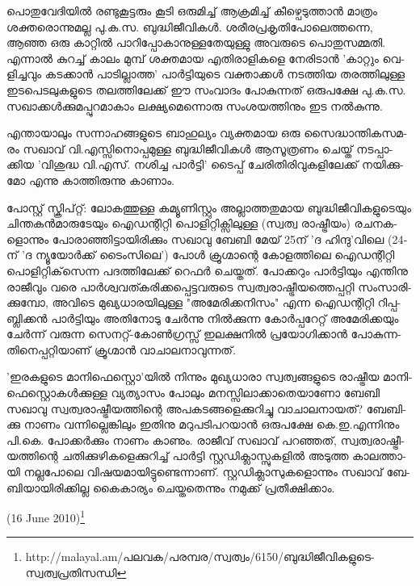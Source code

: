 ­പൊ­തു­വേ­ദി­യില്‍ രണ്ടു­കൂ­ട്ട­രും കൂ­ടി ഒരു­മി­ച്ച് ആക്ര­മി­ച്ച് കീ­ഴ്പെ­ടു­ത്താന്‍ മാ­ത്രം ശക്ത­രൊ­ന്നു­മ­ല്ല പു­.­ക.­സ. ബു­ദ്ധി­ജീ­വി­കള്‍. 
ശരീ­ര­പ്ര­കൃ­തി­പോ­ലെ­ത്ത­ന്നെ, ആഞ്ഞ ഒരു കാ­റ്റില്‍ പാ­റി­പ്പോ­കാ­നു­ള്ള­തേ­യു­ള്ളു അവ­രു­ടെ പൊ­തു­സ­മ്മ­തി. എന്നാല്‍ കു­റ­ച്ച്
കാ­ലം മു­മ്പ് ശക്ത­മായ എതി­രാ­ളി­ക­ളെ നേ­രി­ടാന്‍ 'കാ­റ്റും വെ­ളി­ച്ച­വും കട­ക്കാന്‍ പാ­ടി­ല്ലാ­ത്ത' പാര്‍­ട്ടി­യു­ടെ വക്താ­ക്കള്‍ 
നട­ത്തിയ തര­ത്തി­ലു­ള്ള ഇട­പെ­ട­ലു­ക­ളു­ടെ തല­ത്തി­ലേ­ക്ക് ഈ സം­വാ­ദം പോ­കു­ന്ന­ത് ഒരു­പ­ക്ഷേ പു­.­ക.­സ. 
സഖാ­ക്കള്‍­ക്കു­മ­പ്പു­റ­മാ­കാം ലക്ഷ്യ­മെ­ന്നൊ­രു സം­ശ­യ­ത്തി­നും ഇട നല്‍­കു­ന്നു­.

എ­ന്താ­യാ­ലും സന്നാ­ഹ­ങ്ങ­ളു­ടെ ബാ­ഹു­ല്യം വ്യ­ക്ത­മായ ഒരു സൈ­ദ്ധാ­ന്തി­ക­സ­മ­രം സഖാ­വ് വി­.എ­സ്സി­നൊ­പ്പ­മു­ള്ള 
ബു­ദ്ധി­ജീ­വി­കള്‍ ആസൂ­ത്ര­ണം ചെ­യ്ത് നട­പ്പാ­ക്കിയ 'വി­ശു­ദ്ധ വി­.എ­സ്. നശി­ച്ച പാര്‍­ട്ടി' ടൈ­പ്പ് ചേ­രി­തി­രി­വു­ക­ളി­ലേ­ക്ക് 
നയി­ക്കു­മോ എന്നു കാ­ത്തി­രു­ന്നു കാ­ണാം­.

­പോ­സ്റ്റ് സ്ക്രി­പ്റ്റ്: ലോ­ക­ത്തു­ള്ള കമ്യൂ­ണി­സ്റ്റും അല്ലാ­ത്ത­തു­മായ ബു­ദ്ധി­ജീ­വി­ക­ളു­ടെ­യും ചി­ന്ത­കന്‍­മാ­രു­ടേ­യും ഐഡ­ന്റി­റ്റി 
പൊ­ളി­റ്റി­ക്സി­ലു­ള്ള (സ്വ­ത്വ രാ­ഷ്ട്രീ­യം) രച­ന­ക­ളൊ­ന്നും പോ­രാ­ഞ്ഞി­ട്ടാ­യി­രി­ക്കും സഖാ­വു ബേ­ബി മേ­യ് 25­ന് 'ദ ഹി­ന്ദു­'­വി­ലെ 
(24­ന് 'ദ ന്യൂ­യോര്‍­ക്ക് ടൈം­സി­ലെ­') പോള്‍ ക്രൂ­ഗ്മാ­ന്റെ കോ­ള­ത്തി­ലെ ഐഡ­ന്റി­റ്റി പൊ­ളി­റ്റി­ക്‌­സെ­ന്ന പദ­ത്തി­ലേ­ക്ക് 
റെ­ഫര്‍ ചെ­യ്ത­ത്. പോ­ക്ക­റും പാര്‍­ട്ടി­യും എന്തി­നു രാ­ജീ­വും വരെ പാര്‍­ശ്വ­വ­ത്ക­രി­ക്ക­പ്പെ­ട്ട­വ­രു­ടെ സ്വ­ത്വ­രാ­ഷ്ട്രീ­യ­ത്തെ­പ്പ­റ്റി 
സം­സാ­രി­ക്കു­മ്പോ, അവി­ടെ മു­ഖ്യ­ധാ­ര­യി­ലു­ള്ള "അ­മേ­രി­ക്ക­നി­സം" എന്ന ഐഡ­ന്റി­റ്റി റി­പ്പ­ബ്ലി­ക്കന്‍ പാര്‍­ട്ടി­യും അതി­നോ­ടു 
ചേര്‍­ന്നു നില്‍­ക്കു­ന്ന കോര്‍­പ്പ­റേ­റ്റ് അമേ­രി­ക്ക­യും ചേര്‍­ന്ന് വരു­ന്ന സെ­ന­റ്റ്-കോണ്‍­ഗ്ര­സ്സ് ഇല­ക്ഷ­നില്‍ പ്ര­യോ­ഗി­ക്കാന്‍ 
പോ­കു­ന്ന­തി­നെ­പ്പ­റ്റി­യാ­ണ് ക്രൂ­ഗ്മാന്‍ വാ­ചാ­ല­നാ­വു­ന്ന­ത്.

'ഇ­ര­ക­ളു­ടെ മാ­നി­ഫെ­സ്റ്റൊ­'­യില്‍ നി­ന്നും മു­ഖ്യ­ധാ­രാ സ്വ­ത്വ­ങ്ങ­ളു­ടെ രാ­ഷ്ട്രീയ മാ­നി­ഫെ­സ്റ്റൊ­കള്‍­ക്കു­ള്ള വ്യ­ത്യാ­സം പോ­ലും 
മന­സ്സി­ലാ­ക്കാ­തെ­യാ­ണോ ബേ­ബി സഖാ­വു സ്വ­ത്വ­രാ­ഷ്ട്രീ­യ­ത്തി­ന്റെ അപ­ക­ട­ങ്ങ­ളെ­ക്കു­റി­ച്ചു വാ­ചാ­ല­നാ­യ­ത്? ബേ­ബി­ക്കു 
നാ­ണം വന്നി­ല്ലെ­ങ്കി­ലും ഇതി­നു മറു­പ­ടി­പ­റ­യാന്‍ ഒരു­പ­ക്ഷേ കെ­.ഇ­.എ­ന്നി­നും പി­.­കെ. പോ­ക്കര്‍­ക്കും നാ­ണം കാ­ണും. 
രാ­ജീ­വ് സഖാ­വ് പറ­ഞ്ഞ­ത്, സ്വ­ത്വ­രാ­ഷ്ട്രീ­യ­ത്തി­ന്റെ ചതി­ക്കു­ഴി­ക­ളെ­ക്കു­റി­ച്ച് പാര്‍­ട്ടി സ്റ്റ­ഡി­ക്ലാ­സ്സു­ക­ളില്‍ അടു­ത്ത 
കാ­ല­ത്താ­യി നല്ല­പോ­ലെ വി­ഷ­യ­മാ­യി­ട്ടു­ണ്ടെ­ന്നാ­ണ്. സ്റ്റ­ഡി­ക്ലാ­സു­ക­ളൊ­ന്നും സഖാ­വ് ബേ­ബി­യാ­യി­രി­ക്കി­ല്ല കൈ­കാ­ര്യം 
ചെ­യ്ത­തെ­ന്നും നമു­ക്ക് പ്ര­തീ­ക്ഷി­ക്കാം­.

(16 June 2010)\footnote{http://malayal.am/പലവക/പരമ്പര/സ്വത്വം/6150/ബുദ്ധിജീവികളുടെ-സ്വത്വപ്രതിസന്ധി}

\newpage
